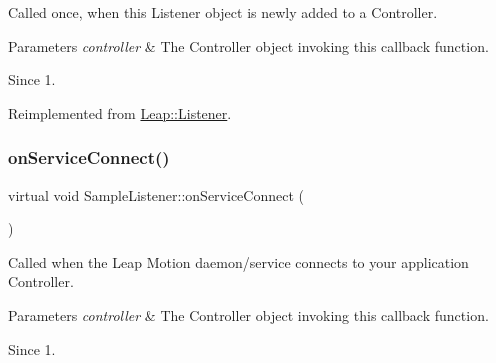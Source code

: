 Called once, when this Listener object is newly added to a Controller.


\begin{DoxyCodeInclude}
\end{DoxyCodeInclude}



\begin{DoxyParams}{Parameters}
{\em controller} & The Controller object invoking this callback function. \\
\hline
\end{DoxyParams}
\begin{DoxySince}{Since}
1. 
\end{DoxySince}


Reimplemented from \hyperlink{class_leap_1_1_listener_a180d621ad08afa5851d03d3546a82bbf}{Leap\+::\+Listener}.

\mbox{\label{class_sample_listener_a52b985b9f9a2db11b99fba2af3c3b6a6}} 
\subsubsection{\texorpdfstring{on\+Service\+Connect()}{onServiceConnect()}\hspace{0.1cm}{\footnotesize\ttfamily [1/2]}}
{\footnotesize\ttfamily virtual void Sample\+Listener\+::on\+Service\+Connect (\begin{DoxyParamCaption}\item[{const \hyperlink{class_leap_1_1_controller}{Controller} \&}]{ }\end{DoxyParamCaption})\hspace{0.3cm}{\ttfamily [virtual]}}

Called when the Leap Motion daemon/service connects to your application Controller.


\begin{DoxyCodeInclude}
\end{DoxyCodeInclude}



\begin{DoxyParams}{Parameters}
{\em controller} & The Controller object invoking this callback function. \\
\hline
\end{DoxyParams}
\begin{DoxySince}{Since}
1. 
\end{DoxySince}


